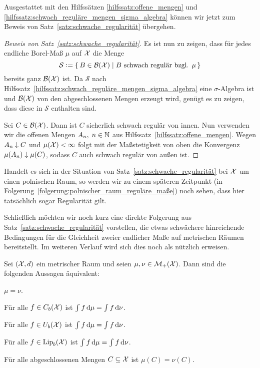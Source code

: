 \documentclass[../thesis/thesis.tex]{subfiles}
\begin{document}
	Ausgestattet mit den Hilfssätzen \ref{hilfssatz:offene_mengen} und \ref{hilfssatz:schwach_reguläre_mengen_sigma_algebra} können wir jetzt zum Beweis von Satz~\ref{satz:schwache_regularität} 
	übergehen.
	
	\begin{proof}[Beweis von Satz~\ref{satz:schwache_regularität}]
		Es ist nun zu zeigen, dass für jedes endliche Borel-Maß $\mu$ auf $\mathcal{X}$
		die Menge 
		$$\mathcal{S} \vcentcolon = \left\{\, B \in \mathcal{B}(\mathcal{X}) \; \middle| \; B \text{ schwach regulär bzgl. } \mu \,\right\}$$
		bereits ganz $\mathcal{B}(\mathcal{X})$ ist. 
		Da $\mathcal{S}$ nach Hilfssatz~\ref{hilfssatz:schwach_reguläre_mengen_sigma_algebra} eine 
		$\sigma$-Algebra ist und 
		$\mathcal{B}(\mathcal{X})$ von den abgeschlossenen Mengen erzeugt wird, genügt es zu zeigen, 
		dass diese in $\mathcal{S}$ enthalten sind. 
		
		Sei $C \in \mathcal{B}(\mathcal{X})$. Dann ist $C$ sicherlich schwach regulär von innen. 
		Nun verwenden wir die offenen Mengen $A_n, \; n \in \mathbb{N}$ aus 
		Hilfssatz~\ref{hilfssatz:offene_mengen}. 
		Wegen $A_n \downarrow C$ und $\mu(\mathcal{X}) < \infty$ folgt mit der 
		Maßstetigkeit von oben die Konvergenz $\mu(A_n) \downarrow \mu(C)$,
		sodass $C$ auch schwach regulär von außen ist.
	\end{proof}

	\begin{Bemerkung}
		Handelt es sich in der Situation von Satz~\ref{satz:schwache_regularität} bei $\mathcal{X}$ um einen polnischen Raum, 
		so werden wir zu einem späteren Zeitpunkt (in Folgerung~\ref{folgerung:polnischer_raum_reguläre_maße}) noch sehen, dass hier tatsächlich sogar Regularität gilt.
	\end{Bemerkung}
	
	Schließlich möchten wir noch kurz eine direkte Folgerung aus Satz~\ref{satz:schwache_regularität} vorstellen, die etwas 
	schwächere hinreichende Bedingungen für die Gleichheit 
	zweier endlicher Maße auf metrischen Räumen bereitstellt. Im weiteren Verlauf 
	wird sich dies noch als nützlich erweisen.
	
	\begin{Folgerung}
		\label{folgerung:gleichheit_von_maßen}
		Sei $(\mathcal{X},d)$ ein metrischer Raum und seien $\mu, \nu \in \mathcal{M}_{+}(\mathcal{X})$. 
		Dann sind die folgenden Aussagen äquivalent:
		\begin{equivalentthm}
			\item $\mu = \nu$.
			\item Für alle $f \in C_b(\mathcal{X})$ ist
			$\int_{} \, f \, \mathrm{d}\mu = \int_{} \, f \, \mathrm{d}\nu$.
			\item Für alle $f \in U_b(\mathcal{X})$ ist
			$\int_{} \, f \, \mathrm{d}\mu = \int_{} \, f \, \mathrm{d}\nu$.
			\item Für alle $f \in \mathrm{Lip}_b(\mathcal{X})$ ist
			$\int_{} \, f \, \mathrm{d}\mu = \int_{} \, f \, \mathrm{d}\nu$.
			\item Für alle abgeschlossenen Mengen $C \subseteq \mathcal{X}$ ist $\mu(C) = \nu(C)$.
		\end{equivalentthm}
	\end{Folgerung}
	
\end{document}
